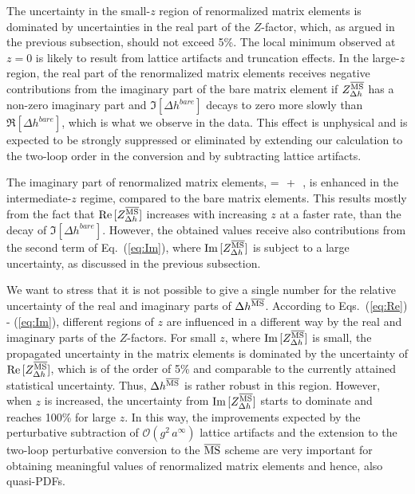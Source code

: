 The uncertainty in the small-$z$ region of renormalized matrix elements is dominated by uncertainties in the real part of the $Z$-factor, which, as argued in the previous subsection, should not exceed 5\%.
The local minimum observed at $z{=}0$ is likely to result from lattice artifacts and truncation effects.
In the large-$z$ region, the real part of the renormalized matrix elements receives negative contributions from the imaginary part of the bare matrix element if $Z_{\Delta h}^{{\overline{\rm MS}}}$ has a non-zero imaginary part and $\Im[\Delta h^{bare}]$ decays to zero more slowly than $\Re[\Delta h^{bare}]$, which is what we observe in the data.
This effect is unphysical and is expected to be strongly suppressed or eliminated by extending our calculation to the two-loop order in the conversion and by subtracting lattice artifacts.

The imaginary part of renormalized matrix elements,
\be
\label{eq:Im}
=\,\, +\,\, ,
\ee
is enhanced in the intermediate-$z$ regime, compared to the bare matrix elements. This results mostly from the fact that
${\rm Re}\,[Z_{\Delta h}^{{\overline{\rm MS}}}]$ increases with increasing $z$ at a faster rate, than the decay of $\Im[\Delta h^{bare}]$.
However, the obtained values receive also contributions from the second term of Eq.~(\ref{eq:Im}), where ${\rm Im}\,[Z_{\Delta h}^{{\overline{\rm MS}}}]$
is subject to a large uncertainty, as discussed in the previous subsection.

We want to stress that it is not possible to give a single number for the relative uncertainty of the real and imaginary parts of $\Delta h^{\overline{\rm MS}}$.
According to Eqs.~(\ref{eq:Re}) - (\ref{eq:Im}), different regions of $z$ are influenced in a different way by the real and imaginary parts of the $Z$-factors.
For small $z$, where ${\rm Im}\,[Z_{\Delta h}^{{\overline{\rm MS}}}]$ is small, the propagated uncertainty in the matrix elements is dominated by the uncertainty of
 ${\rm Re}\,[Z_{\Delta h}^{{\overline{\rm MS}}}]$, which is of the order of 5\% and comparable to the currently attained statistical uncertainty. Thus, $\Delta h^{\overline{\rm MS}}$
is rather robust in this region. However, when $z$ is increased, the uncertainty from ${\rm Im}\,[Z_{\Delta h}^{{\overline{\rm MS}}}]$ starts to dominate and reaches
100\% for large $z$. In this way, the improvements expected by the perturbative subtraction of $\mathcal{O}(g^2\,a^\infty)$ lattice artifacts and the extension
to the two-loop perturbative conversion to the ${\overline{\rm MS}}$ scheme are very important for obtaining meaningful values of renormalized matrix elements and hence, also quasi-PDFs.

